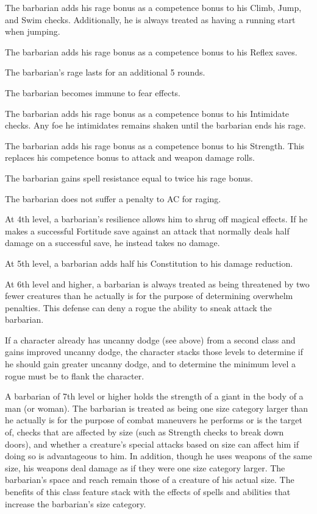  The barbarian adds his rage bonus as a competence bonus to his Climb, Jump, and Swim checks. Additionally, he is always treated as having a running start when jumping.

 The barbarian adds his rage bonus as a competence bonus to his Reflex saves.

 The barbarian's rage lasts for an additional 5 rounds.

 The barbarian becomes immune to fear effects.

 The barbarian adds his rage bonus as a competence bonus to his Intimidate checks. Any foe he intimidates remains shaken until the barbarian ends his rage.

 The barbarian adds his rage bonus as a competence bonus to his Strength. This replaces his competence bonus to attack and weapon damage rolls.


 The barbarian gains spell resistance equal to twice his rage bonus.

 The barbarian does not suffer a  penalty to AC for raging.

 At 4th level, a barbarian's resilience allows him to shrug off magical effects. If he makes a successful Fortitude save against an attack that normally deals half damage on a successful save, he instead takes no damage.

 At 5th level, a barbarian adds half his Constitution to his damage reduction.

 At 6th level and higher, a barbarian is always treated as being threatened by two fewer creatures than he actually is for the purpose of determining overwhelm penalties. This defense can deny a rogue the ability to sneak attack the barbarian.
\par If a character already has uncanny dodge (see above) from a second class and gains improved uncanny dodge, the character stacks those levels to determine if he should gain greater uncanny dodge, and to determine the minimum level a rogue must be to flank the character.

 A barbarian of 7th level or higher holds the strength of a giant in the body of a man (or woman). The barbarian is treated as being one size category larger than he actually is for the purpose of combat maneuvers he performs or is the target of, checks that are affected by size (such as Strength checks to break down doors), and whether a creature's special attacks based on size can affect him if doing so is advantageous to him. In addition, though he uses weapons of the same size, his weapons deal damage as if they were one size category larger. The barbarian's space and reach remain those of a creature of his actual size. The benefits of this class feature stack with the effects of spells and abilities that increase the barbarian's size category.

